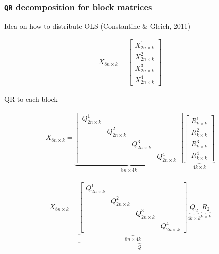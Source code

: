 \documentclass[
  shownotes,
  xcolor={svgnames},
  hyperref={colorlinks,citecolor=DarkBlue,linkcolor=DarkRed,urlcolor=DarkBlue}
  , aspectratio=169]{beamer}
\begin{document}
\begin{frame}[fragile]
\frametitle{\texttt{QR} decomposition for block matrices}
\tiny 
Idea on how to distribute OLS (Constantine \& Gleich, 2011)


\begin{align}
X_{8n\times k}=\left[\begin{array}{c}
X_{2n\times k}^{1}\\
X_{2n\times k}^{2}\\
X_{2n\times k}^{3}\\
X_{2n\times k}^{4}
\end{array}\right]
\end{align}


QR to each block

\begin{align}
X_{8n\times k}=\underset{8n\times4k}{\underbrace{\left[\begin{array}{cccc}
Q_{2n\times k}^{1}\\
 & Q_{2n\times k}^{2}\\
 &  & Q_{2n\times k}^{3}\\
 &  &  & Q_{2n\times k}^{4}
\end{array}\right]}}\underset{4k\times k}{\underbrace{\left[\begin{array}{c}
R_{k\times k}^{1}\\
R_{k\times k}^{2}\\
R_{k\times k}^{3}\\
R_{k\times k}^{4}
\end{array}\right]}}
\end{align}

\begin{align}
X_{8n\times k}=\underset{Q}{\underbrace{\underset{8n\times4k}{\underbrace{\left[\begin{array}{cccc}
Q_{2n\times k}^{1}\\
 & Q_{2n\times k}^{2}\\
 &  & Q_{2n\times k}^{3}\\
 &  &  & Q_{2n\times k}^{4}
\end{array}\right]}}\underset{4k\times k}{\underbrace{Q_{2}}}}}\underset{k\times k}{\underbrace{R_{2}}}
\end{align}

\end{frame}
\end{document}

